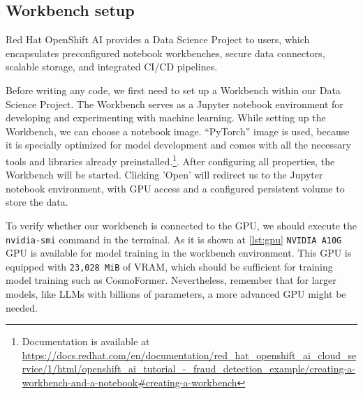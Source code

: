 \subsection*{Workbench setup}

Red Hat OpenShift AI provides a Data Science Project to users, which encapsulates preconfigured notebook workbenches, secure data connectors, scalable storage, and integrated CI/CD pipelines.

\medskip

Before writing any code, we first need to set up a Workbench within our Data Science Project. The Workbench serves as a Jupyter notebook environment for developing and experimenting with machine learning. While setting up the Workbench, we can choose a notebook image. \enquote{PyTorch} image is used, because it is specially optimized for model development and comes with all the necessary tools and libraries already preinstalled.\footnote{Documentation is available at \url{https://docs.redhat.com/en/documentation/red_hat_openshift_ai_cloud_service/1/html/openshift_ai_tutorial_-_fraud_detection_example/creating-a-workbench-and-a-notebook\#creating-a-workbench}}. After configuring all properties, the Workbench will be started. Clicking 'Open' will redirect us to the Jupyter notebook environment, with GPU access and a configured persistent volume to store the data. 

\medskip

To verify whether our workbench is connected to the GPU, we should execute the \texttt{nvidia-smi} command in the terminal. As it is shown at \autoref{lst:gpu} \texttt{NVIDIA A10G} GPU is available for model training in the workbench environment. This GPU is equipped with \texttt{23,028 MiB} of VRAM, which should be sufficient for training model training such as CosmoFormer. Nevertheless, remember that for larger models, like LLMs with billions of parameters, a more advanced GPU might be needed.

\medskip

